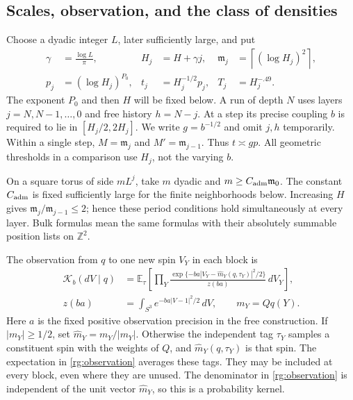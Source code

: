 \subsection{Scales, observation, and the class of densities}
\label{rg:class}

Choose a dyadic integer $L$, later sufficiently large, and put
\begin{equation}
 \begin{aligned}
 \gamma&=\frac{\log L}{\pi},&
 H_j&=H+\gamma j,&
 \mathfrak m_j&=\left\lceil(\log H_j)^2\right\rceil,\\
 p_j&=(\log H_j)^{P_0},&
 t_j&=H_j^{-1/2}p_j,&
 T_j&=H_j^{-.49}.
 \end{aligned}
 \label{rg:scales}
\end{equation}
The exponent $P_0$ and then $H$ will be fixed below.  A run of depth $N$
uses layers $j=N,N-1,\ldots,0$ and free history $h=N-j$.  At a step its
precise coupling $b$ is required to lie in $[H_j/2,2H_j]$.  We write
$g=b^{-1/2}$ and omit $j,h$ temporarily.  Within a single step,
$M=\mathfrak m_j$ and $M'=\mathfrak m_{j-1}$.  Thus $t\asymp gp$.  All
geometric thresholds in a comparison use $H_j$, not the varying $b$.

On a square torus of side $mL^j$, take $m$ dyadic and
$m\ge C_{\rm adm}\mathfrak m_0$.  The constant $C_{\rm adm}$ is fixed sufficiently
large for the finite neighborhoods below.  Increasing $H$ gives
$\mathfrak m_j/\mathfrak m_{j-1}\le2$; hence these period conditions hold simultaneously
at every layer.  Bulk formulas mean the same formulas with their
absolutely summable position lists on $\mathbb Z^2$.

The observation from $q$ to one new spin $V_Y$ in each block is
\begin{equation}
 \begin{aligned}
 \mathcal K_b(dV\mid q)&=
 \mathbb E_{\tau}\!\left[
 \prod_Y\frac{\exp\{-ba|V_Y-\widehat m_Y(q,\tau_Y)|^2/2\}}
 {z(ba)}\,dV_Y\right],\\
 z(ba)&=\int_{S^3}e^{-ba|V-1|^2/2}\,dV,
 \qquad m_Y=Qq(Y).
 \end{aligned}
 \label{rg:observation}
\end{equation}
Here $a$ is the fixed positive observation precision in the free
construction.  If $|m_Y|\ge1/2$, set $\widehat m_Y=m_Y/|m_Y|$.
Otherwise the independent tag $\tau_Y$ samples a constituent spin
with the weights of $Q$, and $\widehat m_Y(q,\tau_Y)$ is that spin.
The expectation in \eqref{rg:observation} averages these tags.
They may be included at every block, even where they are unused.  The denominator
in \eqref{rg:observation} is independent of the unit vector
$\widehat m_Y$, so this is a probability kernel.

